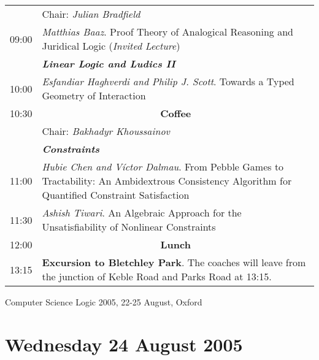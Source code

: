 \documentclass[landscape,12pt]{article}
\newcommand\textbfit[1]{{\bf\em #1}\index{#1}}
\begin{document}
\begin{tabular}{p{1cm}p{21cm}}
& Chair: \emph{Julian Bradfield}\\
09:00 & 	\emph{Matthias Baaz}. Proof Theory of Analogical Reasoning and
Juridical Logic (\emph{Invited Lecture})\\
	& \textbfit{Linear Logic and Ludics II}\\
10:00 & 	\emph{Esfandiar Haghverdi and Philip J. Scott}. Towards a Typed Geometry of Interaction\\
\hline
10:30 & \multicolumn{1}{c}{\textbf{Coffee}}\\
\hline 
& Chair: \emph{Bakhadyr Khoussainov}\\
	& \textbfit{Constraints}\\
11:00 & 	\emph{Hubie Chen and V\'ictor Dalmau}. From Pebble Games to Tractability: An Ambidextrous Consistency Algorithm for Quantified Constraint Satisfaction\\
11:30 & 	\emph{Ashish Tiwari}. An Algebraic Approach for the Unsatisfiability of Nonlinear Constraints\\
\hline
12:00 & 	\multicolumn{1}{c}{\bf Lunch}\\
\hline
13:15 & \textbf{Excursion to Bletchley Park}. The coaches will leave
from the junction of Keble Road and Parks Road at 13:15.
\end{tabular}

\newpage
\begin{center}
\LARGE\sc Computer Science Logic 2005, 22-25 August, Oxford
\end{center}


\section*{Wednesday 24 August 2005}
\end{document}
